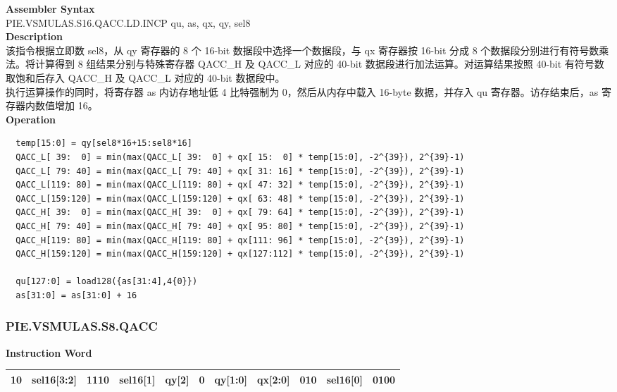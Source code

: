 \textbf{Assembler Syntax} \\
PIE.VSMULAS.S16.QACC.LD.INCP qu, as, qx, qy, sel8 \\
\textbf{Description} \\
该指令根据立即数 sel8，从 qy 寄存器的 8 个 16-bit 数据段中选择一个数据段，与 qx 寄存器按 16-bit 分成 8 个数据段分别进行有符号数乘法。将计算得到 8 组结果分别与特殊寄存器 QACC\_H 及 QACC\_L 对应的 40-bit 数据段进行加法运算。对运算结果按照 40-bit 有符号数取饱和后存入 QACC\_H 及 QACC\_L 对应的 40-bit 数据段中。\\
执行运算操作的同时，将寄存器 as 内访存地址低 4 比特强制为 0，然后从内存中载入 16-byte 数据，并存入 qu 寄存器。访存结束后，as 寄存器内数值增加 16。\\
\textbf{Operation}
\begin{lstlisting}
  temp[15:0] = qy[sel8*16+15:sel8*16]
  QACC_L[ 39:  0] = min(max(QACC_L[ 39:  0] + qx[ 15:  0] * temp[15:0], -2^{39}), 2^{39}-1)
  QACC_L[ 79: 40] = min(max(QACC_L[ 79: 40] + qx[ 31: 16] * temp[15:0], -2^{39}), 2^{39}-1)
  QACC_L[119: 80] = min(max(QACC_L[119: 80] + qx[ 47: 32] * temp[15:0], -2^{39}), 2^{39}-1)
  QACC_L[159:120] = min(max(QACC_L[159:120] + qx[ 63: 48] * temp[15:0], -2^{39}), 2^{39}-1)
  QACC_H[ 39:  0] = min(max(QACC_H[ 39:  0] + qx[ 79: 64] * temp[15:0], -2^{39}), 2^{39}-1)
  QACC_H[ 79: 40] = min(max(QACC_H[ 79: 40] + qx[ 95: 80] * temp[15:0], -2^{39}), 2^{39}-1)
  QACC_H[119: 80] = min(max(QACC_H[119: 80] + qx[111: 96] * temp[15:0], -2^{39}), 2^{39}-1)
  QACC_H[159:120] = min(max(QACC_H[159:120] + qx[127:112] * temp[15:0], -2^{39}), 2^{39}-1)

  qu[127:0] = load128({as[31:4],4{0}})
  as[31:0] = as[31:0] + 16
\end{lstlisting}

\newpage
\subsubsection{PIE.VSMULAS.S8.QACC}\label{instruction:PIEVSMULASS8QACC}
\setlength\tabcolsep{6pt}
\textbf{Instruction Word} \\
\begin{tabular}{|c|c|c|c|c|c|c|c|c|c|c|}
	\hline
	10 & sel16[3:2] & 1110 & sel16[1] & qy[2] & 0 & qy[1:0] & qx[2:0] & 010 & sel16[0] & 0100 \\
	\hline
\end{tabular}

